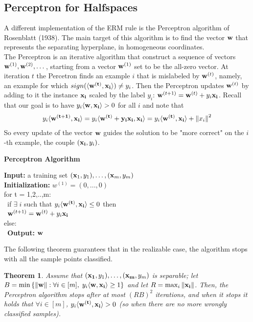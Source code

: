 \documentclass[12pt]{report}
\theoremstyle{plain}
\newtheorem{theorem}{Theorem}[chapter]
\newcommand\sprod[2]{\langle \vb{#1},\vb{#2}\rangle}
\begin{document}
\begin{flushleft}
\subsection{Perceptron for Halfspaces}
A different implementation of the ERM rule is the Perceptron algorithm of 
Rosenblatt (1938). The main target of this algorithm is to find the vector 
$\vb{w}$ that represents the separating hyperplane, in homogeneous 
coordinates.\\
The Perceptron is an iterative algorithm that construct a sequence of vectors 
$\vb{w}^{(1)},\vb{w}^{(2)},\dots$, starting from a vector $\vb{w}^{(1)}$ set to 
be the all-zero vector. At iteration $t$ the Percetron finds an example $i$ 
that is mislabeled by $\vb{w}^{(t)}$, namely, an example for which 
$sign(\sprod{w^{(t)}}{x_i})\neq y_i$. Then the Perceptron updates 
$\vb{w}^{(t)}$ by adding to it the instance $\vb{x_i}$ scaled by the label 
$y_i$: $\vb{w}^{(t+1)}=\vb{w}^{(t)}+y_i\vb{x_i}$. Recall that our goal is to 
have $y_i\sprod{w}{x_i}>0$ for all $i$ and note that
\[ y_i\sprod{w^{(t+1)}} {x_i} = y_i\sprod{w^{(t)}+y_i\vb{x_i}}{x_i} = 
y_i\sprod{w^{(t)}}{x_i}+\norm{x_i}^2 \]
So every update of the vector $\vb{w}$ guides the solution to be "more correct" 
on the $i$-th example, the couple $(\vb{x_i},y_i)$.

\begin{tcolorbox}
	\begin{center}
		\textbf{Perceptron Algorithm}
	\end{center}
	\textbf{Input:} a training set $(\vb{x}_1,y_1),\dots,(\vb{x}_m,y_m)$\\
	\textbf{Initialization:} $w^{(1)} = (0,...,0)$\\
	
	for t = 1,2,..,m:\\
	\-\ \quad	if $\exists\;i $ such that $y_i\sprod{w^{(t)}}{x_i}\leq 0$ 
	then\\
	\-\ \quad	$\vb{w}^{(t+1)}=\vb{w}^{(t)}+y_i\vb{x_i}$\\
		else:\\
	\-\ \quad	\textbf{Output:} $\vb{w}$ 	
\end{tcolorbox}

The following theorem guarantees that in the realizable case, the algorithm 
stops with all the sample points classified.
\begin{theorem}
	Assume that $(\vb{x_1},y_1),\dots,(\vb{x_m},y_m)$ is separable; let 
	$B=\min\left\{\norm{\vb{w}}:\forall i\in [m],\; y_i\sprod{w}{x_i}\geq 1 
	\right\}$ and let $R=\max_i \norm{\vb{x_i}}$. Then, the Perceptron 
	algorithm stops after at most $(RB)^2$ iterations, and when it stops it 
	holds that $\forall i\in [m]$, $y_i\sprod{\vb{w}^{(t)}}{x_i}>0$ (so when 
	there are no more wrongly classified samples).
\end{theorem}


\end{flushleft}
\end{document}
